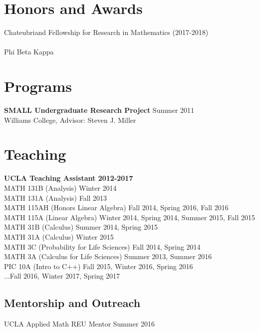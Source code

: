 \documentclass[10pt, a4paper]{article}
\begin{document}
\newpage
\section*{Honors and Awards}
\noindent
Chateubriand Fellowship for Research in Mathematics (2017-2018)\\ \\
Phi Beta Kappa\\

\section*{Programs}
\noindent
\textbf{SMALL Undergraduate Research Project} \hfill Summer 2011\\
Williams College, Advisor: Steven J. Miller\\

\section*{Teaching}
\noindent
\textbf{UCLA Teaching Assistant 2012-2017}\\
MATH 131B (Analysis) \hfill Winter 2014\\
MATH 131A (Analysis) \hfill Fall 2013\\
MATH 115AH (Honors Linear Algebra) \hfill Fall 2014, Spring 2016, Fall 2016\\
MATH 115A (Linear Algebra) \hfill Winter 2014, Spring 2014, Summer 2015, Fall 2015\\
MATH 31B (Calculus) \hfill Summer 2014, Spring 2015\\
MATH 31A (Calculus) \hfill Winter 2015\\
MATH 3C (Probability for Life Sciences) \hfill Fall 2014, Spring 2014\\
MATH 3A (Calculus for Life Sciences) \hfill Summer 2013, Summer 2016\\
PIC 10A (Intro to C++) \hfill Fall 2015, Winter 2016, Spring 2016\\
...\hfill Fall 2016, Winter 2017, Spring 2017\\
% 
\subsection*{Mentorship and Outreach}
UCLA Applied Math REU Mentor \hfill Summer 2016\\

\vfill{}
\end{document}
